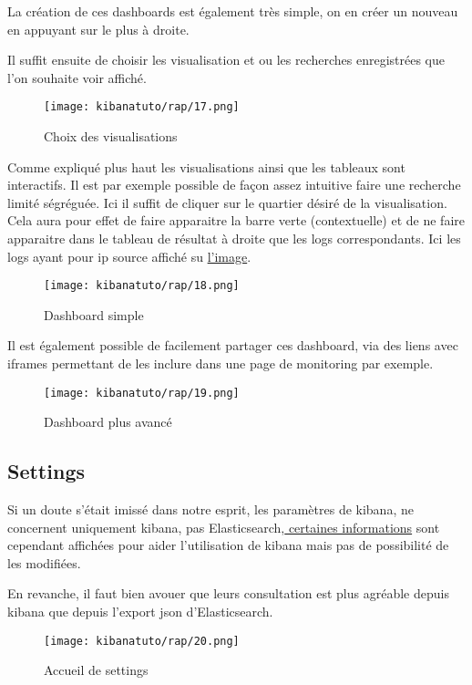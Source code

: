 La création de ces dashboards est également très simple, on en créer un nouveau en 
appuyant sur le plus à droite.

Il suffit ensuite de choisir les visualisation et ou les recherches enregistrées 
que l'on souhaite voir affiché.

\begin{figure}[H]
\center
\texttt{[image: kibanatuto/rap/17.png]}
\label{fig:kibanatuto10}
\caption{Choix des visualisations}
\end{figure}

Comme expliqué plus haut les visualisations ainsi que les tableaux sont interactifs.
Il est par exemple possible de façon assez intuitive faire une recherche limité ségréguée.
Ici il suffit de cliquer sur le quartier désiré de la visualisation. Cela aura pour 
effet de faire apparaitre la barre verte (contextuelle) et de ne faire apparaitre 
dans le tableau de résultat à droite que les logs correspondants. Ici les logs ayant
pour ip source affiché su \hyperref[fig:kibanatuto11]{l'image}.

\begin{figure}[H]
\center
\texttt{[image: kibanatuto/rap/18.png]}
\label{fig:kibanatuto11}
\caption{Dashboard simple}
\end{figure}

Il est également possible de facilement partager ces dashboard, via des liens avec 
iframes permettant de les inclure dans une page de monitoring par exemple.

\begin{figure}[H]
\center
\texttt{[image: kibanatuto/rap/19.png]}
\label{fig:kibanatuto12}
\caption{Dashboard plus avancé}
\end{figure}

\subsection{Settings}
Si un doute s'était imissé dans notre esprit, les paramètres de kibana, ne concernent
uniquement kibana, pas Elasticsearch,\hyperref[fig:kibanatuto14]{ certaines informations} 
sont cependant affichées pour aider l'utilisation de kibana mais pas de possibilité 
de les modifiées.

En revanche, il faut bien avouer que leurs consultation est plus agréable depuis 
kibana que depuis l'export json d'Elasticsearch.

\begin{figure}[H]
\center
\texttt{[image: kibanatuto/rap/20.png]}
\label{fig:kibanatuto13}
\caption{Accueil de settings}
\end{figure}

